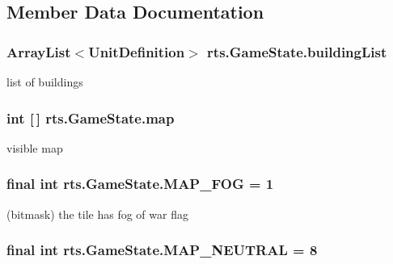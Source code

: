\subsection{Member Data Documentation}
\hypertarget{classrts_1_1_game_state_ab612a7622eee72c8f87534b03b94757f}{
\subsubsection[{buildingList}]{\setlength{\rightskip}{0pt plus 5cm}ArrayList$<${\bf UnitDefinition}$>$ {\bf rts.GameState.buildingList}}}
\label{classrts_1_1_game_state_ab612a7622eee72c8f87534b03b94757f}
list of buildings \hypertarget{classrts_1_1_game_state_a342fc32df68177900b83b038ff416cb1}{
\subsubsection[{map}]{\setlength{\rightskip}{0pt plus 5cm}int \mbox{[}$\,$\mbox{]} {\bf rts.GameState.map}}}
\label{classrts_1_1_game_state_a342fc32df68177900b83b038ff416cb1}
visible map \hypertarget{classrts_1_1_game_state_a530c303576be610b056108a2f8170aab}{
\subsubsection[{MAP\_\-FOG}]{\setlength{\rightskip}{0pt plus 5cm}final int {\bf rts.GameState.MAP\_\-FOG} = 1}}
\label{classrts_1_1_game_state_a530c303576be610b056108a2f8170aab}
(bitmask) the tile has fog of war flag \hypertarget{classrts_1_1_game_state_a91ca0cc55905241db9813413990ce41b}{
\subsubsection[{MAP\_\-NEUTRAL}]{\setlength{\rightskip}{0pt plus 5cm}final int {\bf rts.GameState.MAP\_\-NEUTRAL} = 8}}
